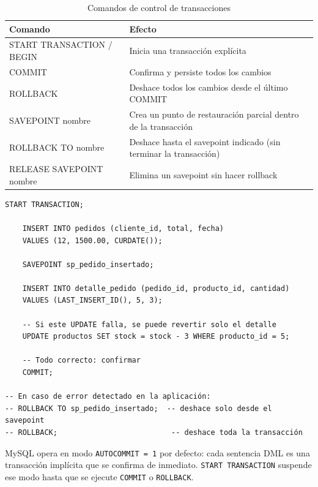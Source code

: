 \begin{table}[H]
  \centering
  \caption{Comandos de control de transacciones}
  \renewcommand{\arraystretch}{1.3}
  \begin{tabularx}{\textwidth}{>{\ttfamily}l X}
    \toprule
    \textbf{Comando}          & \textbf{Efecto}                                               \\
    \midrule
    START TRANSACTION / BEGIN & Inicia una transacción explícita                              \\
    COMMIT                    & Confirma y persiste todos los cambios                         \\
    ROLLBACK                  & Deshace todos los cambios desde el último COMMIT              \\
    SAVEPOINT nombre          & Crea un punto de restauración parcial dentro de la transacción\\
    ROLLBACK TO nombre        & Deshace hasta el savepoint indicado (sin terminar la transacción)\\
    RELEASE SAVEPOINT nombre  & Elimina un savepoint sin hacer rollback                       \\
    \bottomrule
  \end{tabularx}
\end{table}

\begin{lstlisting}[style=sql, caption={Transacción con SAVEPOINT y manejo de errores}]
START TRANSACTION;

    INSERT INTO pedidos (cliente_id, total, fecha)
    VALUES (12, 1500.00, CURDATE());

    SAVEPOINT sp_pedido_insertado;

    INSERT INTO detalle_pedido (pedido_id, producto_id, cantidad)
    VALUES (LAST_INSERT_ID(), 5, 3);

    -- Si este UPDATE falla, se puede revertir solo el detalle
    UPDATE productos SET stock = stock - 3 WHERE producto_id = 5;

    -- Todo correcto: confirmar
    COMMIT;

-- En caso de error detectado en la aplicación:
-- ROLLBACK TO sp_pedido_insertado;  -- deshace solo desde el savepoint
-- ROLLBACK;                          -- deshace toda la transacción
\end{lstlisting}

\begin{nota}
  MySQL opera en modo \texttt{AUTOCOMMIT = 1} por defecto: cada sentencia
  DML es una transacción implícita que se confirma de inmediato.
  \texttt{START TRANSACTION} suspende ese modo hasta que se ejecute
  \texttt{COMMIT} o \texttt{ROLLBACK}.
\end{nota}

